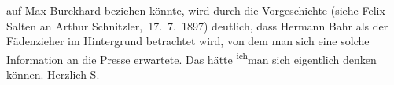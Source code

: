\begin{ledgroupsized}[t]{13cm}
{{{                  auf Max Burckhard beziehen könnte, wird
                  durch die Vorgeschichte (siehe Felix Salten an Arthur Schnitzler, 17. 7. 1897) deutlich,
                  dass Hermann Bahr als der Fädenzieher
                  im Hintergrund betrachtet wird, von dem man sich eine solche Information an 
                  die Presse erwartete.}}}\label{K_L03271-2h}\pend
           \pstart
           Das hätte \substVorne{}\textsuperscript{ich}\substDazwischen{}m\substHinten{}an sich eigentlich denken können.\pend
           \pstart Herzlich \spacefill\mbox{S.}\pend{}
         
         \endnumbering{}\end{ledgroupsized}  \newcommand{\dateiname}{L03271}\newcommand{\titel}{Felix Salten an Arthur Schnitzler, 23. 7. 1897}\newcommand{\editorInnen}{Martin Anton Müller und Laura Untner}
      